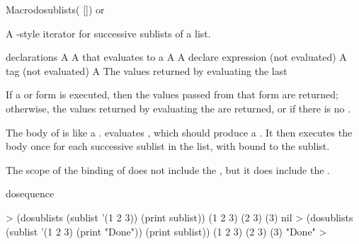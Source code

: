 \documentclass[10pt,twoside,english,pdftex]{article}
\begin{document}

\begin{functiondoc}{Macro}{dosublists}{( 
  []) \superstar{} 
  \returns{} \superstar or \nil}
%
  
\fnsyntax

\fnpurpose A -style iterator for successive sublists of a list.

\fnpackage {}

\fnmodule {}

\fnargs
\begin{args}{declarations}
\arg[var] A 
 A  that evaluates to a 
 A 
\arg[declarations] A declare expression (not evaluated)
\arg[tag] A  tag (not evaluated)
\arg[form] A 
\arg[results] The values returned by evaluating the last 
\end{args}

\fnreturns If a  or  form is executed,
then the values passed from that form are returned; otherwise, the values
returned by evaluating the  are returned, or \nil{}
if there is no .

\fndescription The body of  is like a
.   evaluates
, which should produce a . It then executes
the body once for each successive sublist in the list, with  bound
to the sublist.

The scope of the binding of  does not include the
, but it does include the .

\begin{alsos}{dosequence}
\also[dosequence]
\end{alsos}

\fnexamples
%
\W\supp
\begin{example}
  > (dosublists (sublist '(1 2 3)) (print sublist))
  (1 2 3)
  (2 3) 
  (3) 
  nil\goodpagebreak
  > (dosublists (sublist '(1 2 3) (print "Done")) (print sublist))
  (1 2 3)
  (2 3) 
  (3) 
  "Done"
  >
\end{example}

\end{functiondoc}
\end{document}
